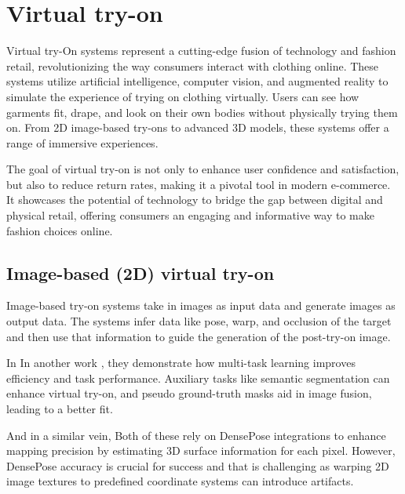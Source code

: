 \section{Virtual try-on} \label{section:vton}
	Virtual try-On systems represent a cutting-edge fusion of technology and fashion retail, revolutionizing the way consumers interact with clothing online. These systems utilize artificial intelligence, computer vision, and augmented reality to simulate the experience of trying on clothing virtually. Users can see how garments fit, drape, and look on their own bodies without physically trying them on. From 2D image-based try-ons to advanced 3D models, these systems offer a range of immersive experiences.
	
	The goal of virtual try-on is not only to enhance user confidence and satisfaction, but also to reduce return rates, making it a pivotal tool in modern e-commerce. It showcases the potential of technology to bridge the gap between digital and physical retail, offering consumers an engaging and informative way to make fashion choices online.

	\subsection{Image-based (2D) virtual try-on}
		Image-based try-on systems take in images as input data and generate images as output data. The systems infer data like pose, warp, and occlusion of the target and then use that information to guide the generation of the post-try-on image.

		In \citeyear{DBLP:conf/iccvw/AyushJCHK19}  In another work \cite{DBLP:conf/iccvw/AyushJCK19}, they demonstrate how multi-task learning improves efficiency and task performance. Auxiliary tasks like semantic segmentation can enhance virtual try-on, and pseudo ground-truth masks aid in image fusion, leading to a better fit.
		
		 And in a similar vein,  Both of these rely on DensePose integrations to enhance mapping precision by estimating 3D surface information for each pixel. However, DensePose accuracy is crucial for success and that is challenging as warping 2D image textures to predefined coordinate systems can introduce artifacts.

